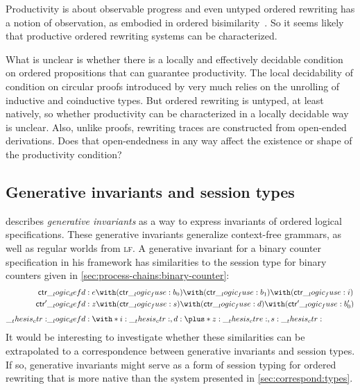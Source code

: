 Productivity is about observable progress and even untyped ordered rewriting has a notion of observation, as embodied in ordered bisimilarity~.
So it seems likely that productive ordered rewriting systems can be characterized.

What is unclear is whether there is a locally and effectively decidable condition on ordered propositions that can guarantee productivity.
The local decidability of condition on circular proofs introduced by \citeauthor{Derakhshan+Pfenning:LMCS20}
very much relies on the unrolling of inductive and coinductive types.
But ordered rewriting is untyped, at least natively, so whether productivity can be characterized in a locally decidable way is unclear.
Also, unlike proofs, rewriting traces are constructed from open-ended derivations.
Does that open-endedness in any way affect the existence or shape of the productivity condition?

\subsection{Generative invariants and session types}

 describes \emph{generative invariants} as a way to express invariants of ordered logical specifications.
These generative invariants generalize context-free grammars, as well as regular worlds from \textsc{lf}.
A generative invariant for a binary counter specification in his framework has similarities to the session type for binary counters given in \cref{sec:process-chains:binary-counter}:
\begin{align*}
  \mathsf{ctr} &\defd e \with (\mathsf{ctr} \fuse b_0) \with (\mathsf{ctr} \fuse b_1) \with (\mathsf{ctr} \fuse i) \\
  \mathsf{ctr}' &\defd z \with (\mathsf{ctr} \fuse s) \with (\mathsf{ctr} \fuse d) \with (\mathsf{ctr}' \fuse b'_0) \\[1ex]
  \ctr &\defd \with*{ i: \ctr , d: \plus*{ z: \ctre , s: \ctr } }
\end{align*}
It would be interesting to investigate whether these similarities can be extrapolated to a correspondence between generative invariants and session types.
If so, generative invariants might serve as a form of session typing for ordered rewriting that is more native than the system presented in \cref{sec:correspond:types}.


